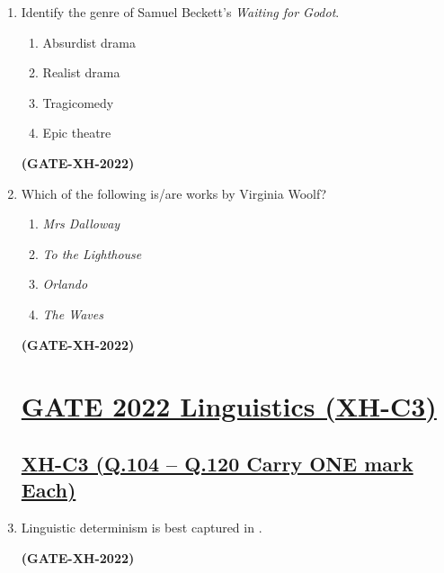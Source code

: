 \documentclass[journal]{IEEEtran}
\begin{document}
\begin{enumerate}
\item Identify the genre of Samuel Beckett’s \textit{Waiting for Godot}.
\begin{multicols}{4}
\begin{enumerate}
\item Absurdist drama
\item Realist drama
\item Tragicomedy
\item Epic theatre
\end{enumerate}
\end{multicols}
\hfill\textbf{(GATE-XH-2022)}

\item Which of the following is/are works by Virginia Woolf?
\begin{multicols}{2}
\begin{enumerate}
\item \textit{Mrs Dalloway}
\item \textit{To the Lighthouse}
\item \textit{Orlando}
\item \textit{The Waves}
\end{enumerate}
\end{multicols}
\hfill\textbf{(GATE-XH-2022)}
\newpage
\section*{\large \underline{\textbf {GATE 2022 Linguistics (XH-C3)}}}
\subsection*{\underline{\textbf {XH-C3 (Q.104 – Q.120 Carry ONE mark Each)}}}
\vspace{0.4cm}
\item Linguistic determinism is best captured in \underline{\hspace{2cm}}.
\begin{enumerate}
\end{enumerate}
\hfill\textbf{(GATE-XH-2022)}


\end{enumerate}
\end{document}
